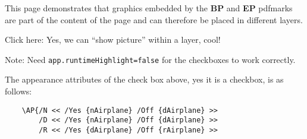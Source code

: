 \documentclass{article}
\begin{document}
\maketitle

This page demonstrates that graphics embedded by the \textbf{BP} and
\textbf{EP} pdfmarks are part of the content of the page and can
therefore be placed in different layers.

\begin{center}\setlength{\fboxsep}{0pt}
\end{center}

Click here: 
Yes, we can ``show picture'' within a layer, cool!\eBld

\medskip
\textcolor[rgb]{1.00,0.00,0.00}{Note:}
Need \verb!app.runtimeHighlight=false! for the checkboxes to work correctly.

\medskip The appearance attributes of the check box above, yes it is
a checkbox, is as follows:

\begin{small}
\begin{verbatim}
    \AP{/N << /Yes {nAirplane} /Off {dAirplane} >>
        /D << /Yes {nAirplane} /Off {dAirplane} >>
        /R << /Yes {dAirplane} /Off {rAirplane} >>
\end{verbatim}
\end{small}
\end{document}
